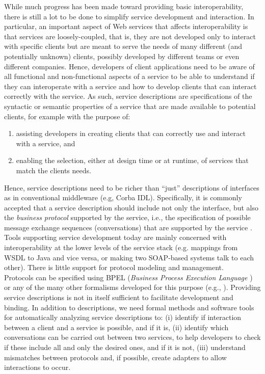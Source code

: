 While much progress has been made toward providing basic interoperability, there is still a lot to
be done to simplify service development and interaction. In particular, an important aspect of Web
services that affects interoperability is that services are loosely-coupled, that is, they are not
developed only to interact with specific clients but are meant to serve the needs of many different (and potentially unknown) 
clients, possibly developed by different teams or even different companies. Hence, developers of
client applications need to be aware of all functional and non-functional aspects of a service to be
able to understand if they can interoperate with a service and how to develop clients that can
interact correctly with the service. 
As such, service descriptions are specifications of the syntactic or semantic properties of a service that are made available to potential clients, for example with the purpose of:
\begin{enumerate}
  \item assisting developers in creating clients that can correctly use and interact with a service, and 
  \item enabling the selection, either at design time or at runtime, of services that match the clients needs.
\end{enumerate}

Hence, service descriptions need to be richer than ``just''
descriptions of interfaces as in conventional middleware (e.g, Corba IDL). Specifically, it is commonly accepted that
a service description should include not only the interface, but also the \emph{business protocol}
supported by the service, i.e., the specification of possible message exchange sequences
(conversations) that are supported by the service \cite{BBFC04}.
Tools supporting service development today are mainly concerned with interoperability at the lower
levels of the service stack (e.g. mappings from WSDL to Java and vice versa, or making two SOAP-based
systems talk to each other). There is little support for protocol modeling and management.\\

Protocols can be specified using BPEL (\emph{Business Process Execution Language} \cite{WSBPEL2}) or any of the many other formalisms developed for this purpose (e.g., \cite{BBFC04,FTBB,berardithesis}).
%
Providing service descriptions is not in itself sufficient to facilitate development and binding. In addition to descriptions, we need formal methods and software tools for automatically analyzing service descriptions to:
(i) identify if interaction between a client and a service is possible, and if it is,
(ii) identify which conversations can be carried out between two services, to help developers to check if these include all and only the desired ones, and if it is not,
(iii) understand mismatches between protocols and, if possible, create adapters to allow interactions to occur. \\

